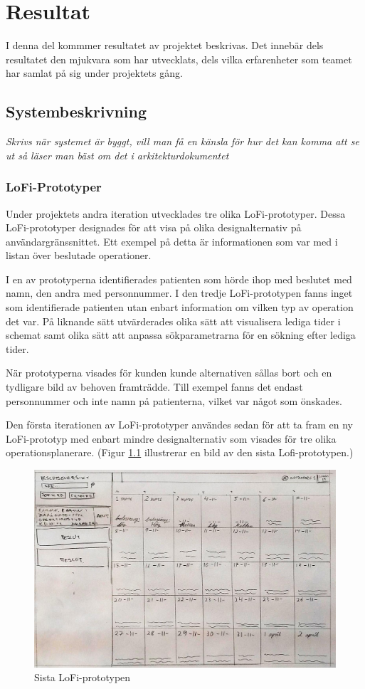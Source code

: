 \chapter{Resultat}
I denna del kommmer resultatet av projektet beskrivas. Det innebär dels
resultatet den mjukvara som har utvecklats, dels vilka erfarenheter som
teamet har samlat på sig under projektets gång.
\section{Systembeskrivning}
\textit{Skrivs när systemet är byggt, vill man få en känsla för hur det kan
komma att se ut så läser man bäst om det i arkitekturdokumentet}
\subsection{LoFi-Prototyper}
Under projektets andra iteration utvecklades tre olika LoFi-prototyper. Dessa
LoFi-prototyper designades för att visa på olika designalternativ på
användargränssnittet. Ett exempel på detta är informationen som var med i listan
över beslutade operationer.

I en av prototyperna identifierades patienten som hörde ihop med beslutet med namn, den andra med personnummer. I den tredje LoFi-prototypen
fanns inget som identifierade patienten utan enbart information om vilken
typ av operation det var. På liknande sätt utvärderades olika sätt att
visualisera lediga tider i schemat samt olika sätt att anpassa sökparametrarna för en sökning efter lediga tider.

När prototyperna visades för kunden kunde alternativen sållas bort och en tydligare bild av behoven framträdde.
Till exempel fanns det endast personnummer och inte namn på patienterna, vilket var något som önskades.

Den första iterationen av LoFi-prototyper användes sedan för att ta fram en ny
LoFi-prototyp med enbart mindre designalternativ som visades för tre olika
operationsplanerare. (Figur \ref{fig:LofiPic} illustrerar en bild av den sista Lofi-prototypen.)

\begin{figure}[h]
  \includegraphics[width=\linewidth]{Figures/LoFi_no2.jpg}
  \caption{Sista LoFi-prototypen}
  \label{fig:LofiPic}
\end{figure}

